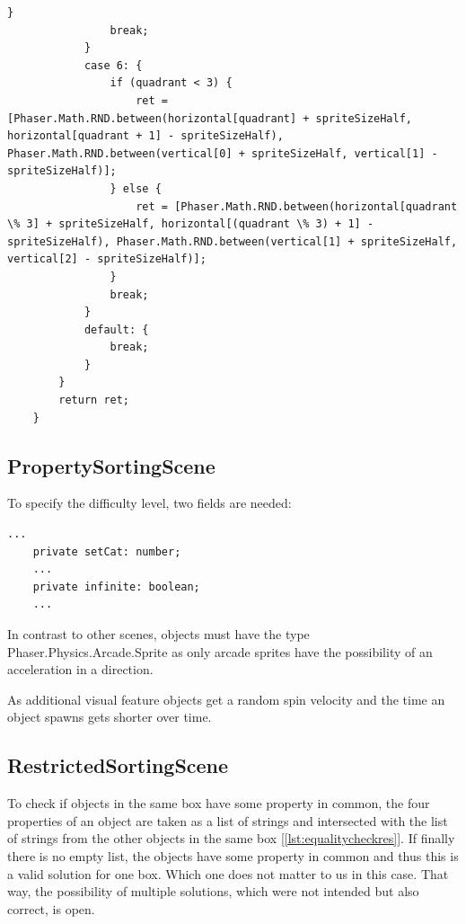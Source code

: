 \begin{lstlisting}[style=TypeScript, caption={returnQuad() (sortingScene.ts)}, label={lst:returnquad}]
                }
                break;
            }
            case 6: {
                if (quadrant < 3) {
                    ret = [Phaser.Math.RND.between(horizontal[quadrant] + spriteSizeHalf, horizontal[quadrant + 1] - spriteSizeHalf), Phaser.Math.RND.between(vertical[0] + spriteSizeHalf, vertical[1] - spriteSizeHalf)];
                } else {
                    ret = [Phaser.Math.RND.between(horizontal[quadrant \% 3] + spriteSizeHalf, horizontal[(quadrant \% 3) + 1] - spriteSizeHalf), Phaser.Math.RND.between(vertical[1] + spriteSizeHalf, vertical[2] - spriteSizeHalf)];
                }
                break;
            }
            default: {
                break;
            }
        }
        return ret;
    }
\end{lstlisting}

\subsection{PropertySortingScene}\label{subsec:propertysortingscene}
To specify the difficulty level, two fields are needed:
\begin{lstlisting}[style=TypeScript, caption={Level fields (propertySortingScene.ts)}]
    ...
    private setCat: number;
    ...
    private infinite: boolean;
    ...
\end{lstlisting}

In contrast to other scenes, objects must have the type Phaser.Physics.Arcade.Sprite as only arcade sprites have the
possibility of an acceleration in a direction.

As additional visual feature objects get a random spin velocity and the time an object spawns gets shorter over time.

\subsection{RestrictedSortingScene}\label{subsec:restrictedsortingscene}
To check if objects in the same box have some property in common,
the four properties of an object are taken as a list of strings and intersected with the list of strings from the other
objects in the same box [\ref{lst:equalitycheckres}].
If finally there is no empty list, the objects have some property in common and thus this is a valid solution for one box.
Which one does not matter to us in this case.
That way, the possibility of multiple solutions, which were not intended but also correct, is open.

